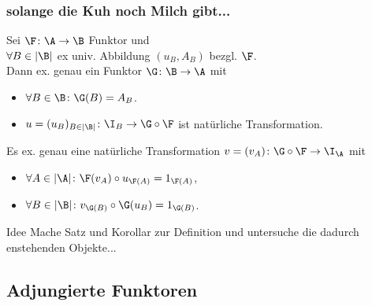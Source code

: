 \begin{frame}[fragile]
  \frametitle{solange die Kuh noch Milch gibt...}
  \begin{thm*}
    Sei $\F \colon \A \to \B$ Funktor und \\
    $\forall B \in |\B|$ ex univ. Abbildung $(u_B, A_B)$ bezgl. $\F$. \\
    Dann ex. genau ein Funktor $\G \colon \B \to \A$ mit
    \begin{itemize}
      \item $\forall B \in \B \colon \G(B) = A_B$.
      \item $u = (u_B)_{B \in |\B|} \colon \I_B \to \G \circ \F$ ist natürliche Transformation.
    \end{itemize}
  \end{thm*}
\pause
  \begin{kor*}
    Es ex. genau eine nat\"urliche Transformation $v = (v_A) \colon \G \circ \F \to \I_\A$ mit
    \begin{itemize}
      \item $\forall A \in |\A| \colon \F(v_A) \circ u_{\F(A)} = 1_{\F(A)}$,
      \item $\forall B \in |\B| \colon v_{\G(B)} \circ \G(u_B) = 1_{\G(B)}$.
    \end{itemize}
  \end{kor*}
\vspace{1em}
\pause
  \begin{block}{Idee}
Mache Satz und Korollar zur Definition und untersuche die dadurch enstehenden Objekte...
  \end{block}

\end{frame}
\subsection{Adjungierte Funktoren}

